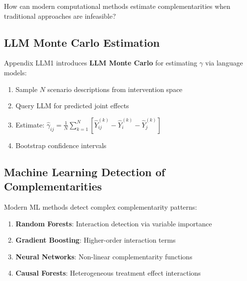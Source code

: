 \begin{tcolorbox}[colback=cyan!5!white,colframe=cyan!75!black,title=\textbf{Fundamental Question}]
How can modern computational methods estimate complementarities when traditional approaches are infeasible?
\end{tcolorbox}

\subsection{LLM Monte Carlo Estimation}
\label{subsec:llm-monte-carlo}

Appendix LLM1 introduces \textbf{LLM Monte Carlo} for estimating $\gamma$ via language models:

\begin{definition}
\begin{enumerate}
    \item Sample $N$ scenario descriptions from intervention space
    \item Query LLM for predicted joint effects
    \item Estimate: $\hat{\gamma}_{ij} = \frac{1}{N} \sum_{k=1}^{N} [\hat{Y}_{ij}^{(k)} - \hat{Y}_i^{(k)} - \hat{Y}_j^{(k)}]$
    \item Bootstrap confidence intervals
\end{enumerate}
\end{definition}

\subsection{Machine Learning Detection of Complementarities}
\label{subsec:ml-detection}

Modern ML methods detect complex complementarity patterns:

\begin{enumerate}
    \item \textbf{Random Forests}: Interaction detection via variable importance
    \item \textbf{Gradient Boosting}: Higher-order interaction terms
    \item \textbf{Neural Networks}: Non-linear complementarity functions
    \item \textbf{Causal Forests}: Heterogeneous treatment effect interactions
\end{enumerate}

